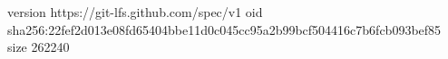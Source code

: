 version https://git-lfs.github.com/spec/v1
oid sha256:22fef2d013e08fd65404bbe11d0c045cc95a2b99bcf504416c7b6fcb093bef85
size 262240
